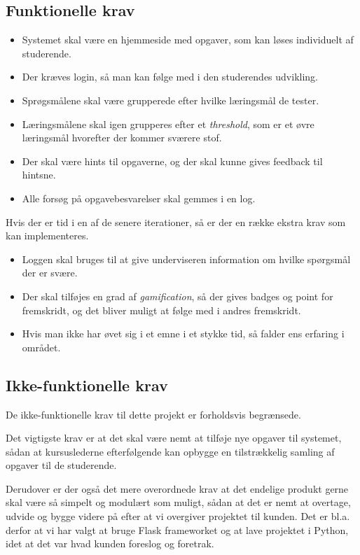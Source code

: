 \documentclass[12pt]{article}
\begin{document}
\subsection{Funktionelle krav}
\begin{itemize}
    \item Systemet skal være en hjemmeside med opgaver, som kan løses individuelt af studerende.
    \item Der kræves login, så man kan følge med i den studerendes udvikling.
    \item Sprøgsmålene skal være grupperede efter hvilke læringsmål de tester.
    \item Læringsmålene skal igen grupperes efter et \emph{threshold}, som er et øvre læringsmål hvorefter der kommer sværere stof.
    \item Der skal være hints til opgaverne, og der skal kunne gives feedback til hintsne.
    \item Alle forsøg på opgavebesvarelser skal gemmes i en log.
\end{itemize}
Hvis der er tid i en af de senere iterationer, så er der en række ekstra krav som kan implementeres.
\begin{itemize}
    \item Loggen skal bruges til at give underviseren information om hvilke spørgsmål der er svære.
    \item Der skal tilføjes en grad af \emph{gamification}, så der gives badges og point for fremskridt, og det bliver muligt at følge med i andres fremskridt.
    \item Hvis man ikke har øvet sig i et emne i et stykke tid, så falder ens erfaring i området.
\end{itemize}
\subsection{Ikke-funktionelle krav}
De ikke-funktionelle krav til dette projekt er forholdsvis begrænsede. 

Det vigtigste krav er at det skal være nemt at tilføje nye opgaver til systemet, sådan at kursuslederne efterfølgende kan opbygge en tilstrækkelig samling af opgaver til de studerende.

Derudover er der også det mere overordnede krav at det endelige produkt gerne skal være så simpelt og modulært som muligt, sådan at det er nemt at overtage, udvide og bygge videre på efter at vi overgiver projektet til kunden. Det er bl.a. derfor at vi har valgt at bruge Flask frameworket og at lave projektet i Python, idet at det var hvad kunden foreslog og foretrak.
\end{document}
